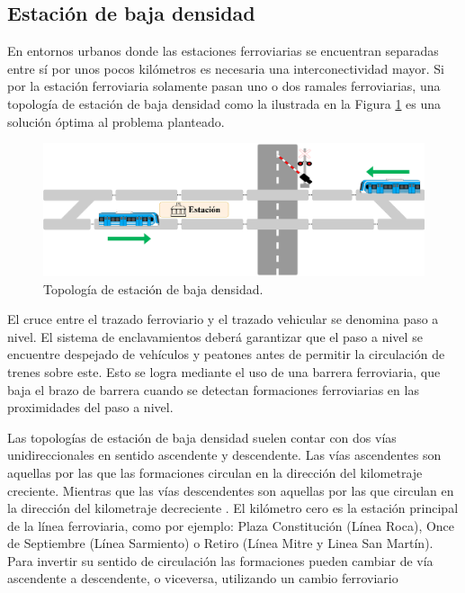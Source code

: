 \subsection{Estación de baja densidad}


En entornos urbanos donde las estaciones ferroviarias se encuentran separadas entre sí por unos pocos kilómetros es necesaria una interconectividad mayor. Si por la estación ferroviaria solamente pasan uno o dos ramales ferroviarias, una topología de estación de baja densidad como la ilustrada en la Figura \ref{fig:simple_1} es una solución óptima al problema planteado.

    \begin{figure}[h]
        \centering
        \includegraphics[width=1\textwidth]{Figuras/bajaDensidad}
        \centering\caption{Topología de estación de baja densidad.}
        \label{fig:simple_1}
    \end{figure}

El cruce entre el trazado ferroviario y el trazado vehicular se denomina paso a nivel. El sistema de enclavamientos deberá garantizar que el paso a nivel se encuentre despejado de vehículos y peatones antes de permitir la circulación de trenes sobre este. Esto se logra mediante el uso de una barrera ferroviaria, que baja el brazo de barrera cuando se detectan formaciones ferroviarias en las proximidades del paso a nivel.

Las topologías de estación de baja densidad suelen contar con dos vías unidireccionales en sentido ascendente y descendente. 
Las vías ascendentes son aquellas por las que las formaciones circulan en la dirección del kilometraje creciente. Mientras que las vías descendentes son aquellas por las que circulan en la dirección del kilometraje decreciente \cite{RITO}. El kilómetro cero es la estación principal de la línea ferroviaria, como por ejemplo: Plaza Constitución (Línea Roca), Once de Septiembre (Línea Sarmiento) o Retiro (Línea Mitre y Linea San Martín). Para invertir su sentido de circulación las formaciones pueden cambiar de vía
ascendente a descendente, o viceversa, utilizando un cambio ferroviario